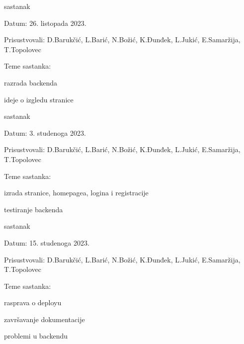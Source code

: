\begin{packed_enum}
			\item  sastanak
			\item[] \begin{packed_item}
				\item Datum: 26. listopada 2023.
				\item Prisustvovali: D.Barukčić, L.Barić, N.Božić, K.Đunđek, L.Jukić, E.Samaržija, T.Topolovec
				\item Teme sastanka:
				\begin{packed_item}
					\item  razrada backenda 
					\item  ideje o izgledu stranice
					
				\end{packed_item}
			\end{packed_item}
			
			\item  sastanak
			\item[] \begin{packed_item}
				\item Datum: 3. studenoga 2023.
				\item Prisustvovali: D.Barukčić, L.Barić, N.Božić, K.Đunđek, L.Jukić, E.Samaržija, T.Topolovec
				\item Teme sastanka:
				\begin{packed_item}
					\item  izrada stranice, homepagea, logina i registracije
					\item  testiranje backenda
				\end{packed_item}
			\end{packed_item}
			
			\item  sastanak
			\item[] \begin{packed_item}
				\item Datum: 15. studenoga 2023.
				\item Prisustvovali: D.Barukčić, L.Barić, N.Božić, K.Đunđek, L.Jukić, E.Samaržija, T.Topolovec
				\item Teme sastanka:
				\begin{packed_item}
					\item  rasprava o deployu
					\item  završavanje dokumentacije
					\item  problemi u backendu 
				\end{packed_item}
			\end{packed_item}
			
			
		\end{packed_enum}
		
